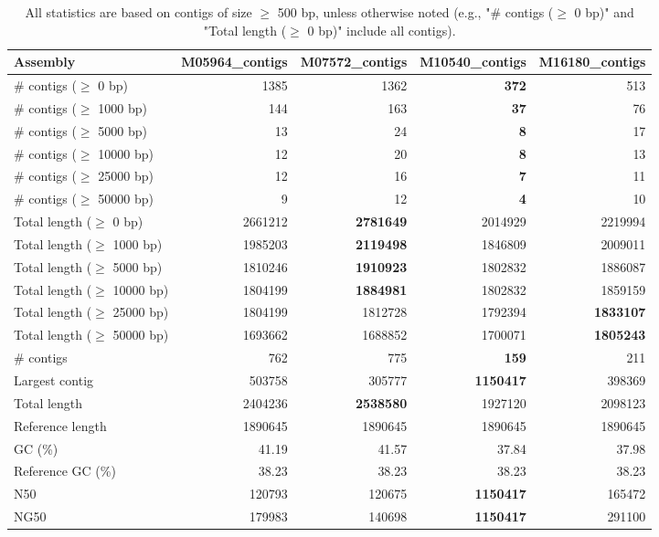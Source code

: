 \documentclass[12pt,a4paper]{article}
\begin{document}
\begin{table}[ht]
\begin{center}
\caption{All statistics are based on contigs of size $\geq$ 500 bp, unless otherwise noted (e.g., "\# contigs ($\geq$ 0 bp)" and "Total length ($\geq$ 0 bp)" include all contigs).}
\begin{tabular}{|l*{4}{|r}|}
\hline
Assembly & M05964\_contigs & M07572\_contigs & M10540\_contigs & M16180\_contigs \\ \hline
\# contigs ($\geq$ 0 bp) & 1385 & 1362 & {\bf 372} & 513 \\ \hline
\# contigs ($\geq$ 1000 bp) & 144 & 163 & {\bf 37} & 76 \\ \hline
\# contigs ($\geq$ 5000 bp) & 13 & 24 & {\bf 8} & 17 \\ \hline
\# contigs ($\geq$ 10000 bp) & 12 & 20 & {\bf 8} & 13 \\ \hline
\# contigs ($\geq$ 25000 bp) & 12 & 16 & {\bf 7} & 11 \\ \hline
\# contigs ($\geq$ 50000 bp) & 9 & 12 & {\bf 4} & 10 \\ \hline
Total length ($\geq$ 0 bp) & 2661212 & {\bf 2781649} & 2014929 & 2219994 \\ \hline
Total length ($\geq$ 1000 bp) & 1985203 & {\bf 2119498} & 1846809 & 2009011 \\ \hline
Total length ($\geq$ 5000 bp) & 1810246 & {\bf 1910923} & 1802832 & 1886087 \\ \hline
Total length ($\geq$ 10000 bp) & 1804199 & {\bf 1884981} & 1802832 & 1859159 \\ \hline
Total length ($\geq$ 25000 bp) & 1804199 & 1812728 & 1792394 & {\bf 1833107} \\ \hline
Total length ($\geq$ 50000 bp) & 1693662 & 1688852 & 1700071 & {\bf 1805243} \\ \hline
\# contigs & 762 & 775 & {\bf 159} & 211 \\ \hline
Largest contig & 503758 & 305777 & {\bf 1150417} & 398369 \\ \hline
Total length & 2404236 & {\bf 2538580} & 1927120 & 2098123 \\ \hline
Reference length & 1890645 & 1890645 & 1890645 & 1890645 \\ \hline
GC (\%) & 41.19 & 41.57 & 37.84 & 37.98 \\ \hline
Reference GC (\%) & 38.23 & 38.23 & 38.23 & 38.23 \\ \hline
N50 & 120793 & 120675 & {\bf 1150417} & 165472 \\ \hline
NG50 & 179983 & 140698 & {\bf 1150417} & 291100 \\ \hline

\end{tabular}
\end{center}
\end{table}
\end{document}
